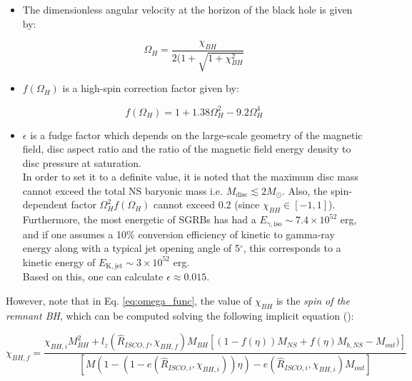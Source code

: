     \begin{itemize}

        \item The dimensionless angular velocity at the horizon of the black hole is
            given by:

            \begin{equation}
                \Omega_H = \dfrac{\chi_{BH}}{2(1 + \sqrt{1 + \chi_{BH}^2}}
                \label{eq:omega_func}
            \end{equation}

        \item $f(\Omega_H)$ is a high-spin correction factor given by:

            \begin{equation}
               f(\Omega_H) = 1 + 1.38\Omega_H^2 - 9.2 \Omega_H^4
               \label{eq:Omega_h}
            \end{equation}

        \item $\epsilon$ is a fudge factor which depends on the large-scale geometry of
            the magnetic field, disc aspect ratio and the ratio of the magnetic field
            energy density to disc pressure at saturation.\\ In order to set it to a
            definite value, it is noted that the maximum disc mass cannot exceed the
            total NS baryonic mass i.e. $M_{\mathrm{disc}} \lesssim 2M_\odot$. Also, the
            spin-dependent factor $\Omega_H^2f(\Omega_H)$ cannot exceed 0.2 (since
            $\chi_{BH} \in [-1, 1]$). Furthermore, the most energetic of SGRBs has had a
            $E_{\gamma, \mathrm{iso}} \sim 7.4 \times 10^{52}$ erg, and if one assumes a
            10\% conversion efficiency of kinetic to gamma-ray energy along with a
            typical jet opening angle of 5$^{\circ}$, this corresponds to a kinetic
            energy of $E_{\mathrm{K, jet}} \sim 3 \times 10^{52}$ erg.\\
            Based on this, one can calculate $\boxed{\epsilon \approx 0.015}$.

    \end{itemize}

    However, note that in Eq. \ref{eq:omega_func}, the value of $\chi_{BH}$ is the
    \emph{spin of the remnant BH}, which can be computed solving the following implicit
    equation (\cite{pannarale_2013}):

    \begin{equation}
        \chi_{BH, f} = \dfrac
            {
                \chi_{BH, i}M_{BH}^2 + l_z(\hat{R}_{ISCO, f}, \chi_{BH, f}) M_{BH}
                [ (1 - f(\eta))M_{NS} + f(\eta) M_{b, NS} - M_{out}) ]
            }
            {
                [M (1 - ( 1 - e(\hat{R}_{ISCO, i}, \chi_{BH, i}) ) \eta ) -
                e(\hat{R}_{ISCO, i}, \chi_{BH, i}) M_{out}]
            }
    \end{equation}

